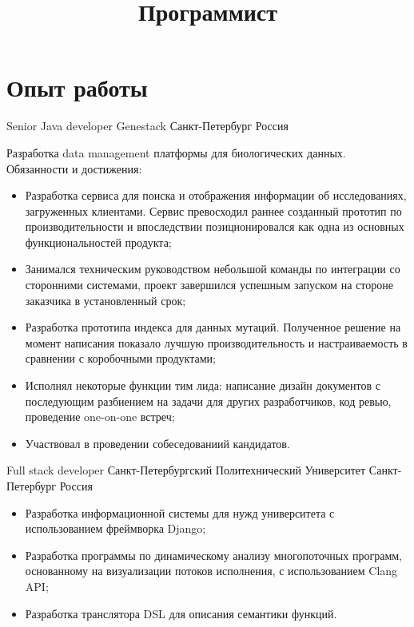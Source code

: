 \documentclass{moderncv}
\title{Программист}
\begin{document}
\makecvtitle

\section{Опыт работы}

        {Senior Java developer}
        {Genestack}
        {Санкт-Петербург}
        {Россия}
        {Разработка data management платформы для биологических данных. \newline{} Обязанности и достижения:
        \begin{itemize}
            \item Разработка сервиса для поиска и отображения информации об исследованиях, загруженных клиентами. 
            Сервис превосходил раннее созданный прототип по производительности и впоследствии 
            позиционировался как одна из основных функциональностей продукта;
            \item Занимался техническим руководством небольшой команды по интеграции со сторонними системами,
            проект завершился успешным запуском на стороне заказчика в установленный срок;
            \item Разработка прототипа индекса для данных мутаций. Полученное решение на момент написания показало
            лучшую производительность и настраиваемость в сравнении с коробочными продуктами;
            \item Исполнял некоторые функции тим лида: написание дизайн документов с последующим разбиением на задачи для других разработчиков, код ревью, проведение one-on-one встреч; 
            \item Участвовал в проведении собеседованиий кандидатов.
        \end{itemize}}

        {Full stack developer}
        {Санкт-Петербургский Политехнический Университет}
        {Санкт-Петербург}
        {Россия}
        {\begin{itemize}
            \item Разработка информационной системы для нужд университета с использованием фреймворка Django;
            \item Разработка программы по динамическому анализу многопоточных программ, основанному на визуализации
            потоков исполнения, с использованием Clang API;
            \item Разработка транслятора DSL для описания семантики функций.
        \end{itemize}}
\end{document}

